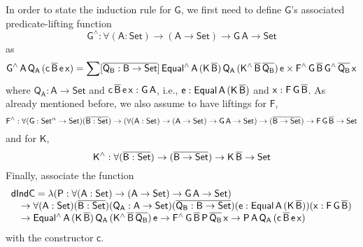 \documentclass[9pt]{entcs}
\begin{document}
In order to state the induction rule for $\mathsf{G}$,
we first need to define $\mathsf{G}$'s associated predicate-lifting function 
\[
\mathsf{G^{\wedge} : \forall (A : Set) \to (A \to Set) \to G\,A \to Set}
\]
as
\[
\mathsf{G^{\wedge}\,A\,Q_A\,(c\,\overline{B}\,e\,x)
= \sum [\overline{Q_B : B \to Set}]\,
Equal^{\wedge}\,A\,(K\,\overline{B})\,Q_A\,(K^{\wedge}\,\overline{B}\,\overline{Q_B})\,e
\times F^{\wedge}\,G\,\overline{B}\,G^{\wedge}\,{\overline{Q_B}}\,x}
\]
where $\mathsf{Q_A : A \to Set}$
and $\mathsf{c\,\overline{B}\,e\,x : G\,A}$,
i.e., $\mathsf{e : Equal\,A\,(K\,\overline{B})}$ and $\mathsf{x : F\,G\,\overline{B}}$.
As already mentioned before, we also assume to have liftings for $\mathsf{F}$,
\[
\mathsf{F^{\wedge} : \forall (G : Set^{\alpha} \to Set) (\overline{B : Set})
\to (\forall (A : Set) \to (A \to Set) \to G\,A \to Set)
\to (\overline{B \to Set})
\to F\,G\,\overline{B} \to Set}
\]
and for  $\mathsf{K}$,
\[
\mathsf{K^{\wedge} : \forall (\overline{B : Set}) \to (\overline{B \to Set}) \to K\,\overline{B} \to Set}
\]
Finally, associate the function
\[
\begin{array}{l}
\mathsf{dIndC = \lambda (P : \forall (A : Set) \to (A \to Set) \to G\,A \to Set)} \\
\quad \mathsf{\to \forall (A : Set) (\overline{B : Set}) (Q_A : A \to Set) (\overline{Q_B : B \to Set}) (e : Equal\,A\,(K\,\overline{B})) (x : F\,G\,\overline{B})} \\
\quad \mathsf{\to Equal^{\wedge}\,A\,(K\,\overline{B})\,Q_A\,(K^{\wedge}\,\overline{B}\,\overline{Q_B})\,e
	\to F^{\wedge}\,G\,\overline{B}\,P\,\overline{Q_B}\,x
	\to P\,A\,Q_A\,(c\,\overline{B}\,e\,x)}
\end{array}
\]
with the constructor $\mathsf{c}$.
\end{document}

